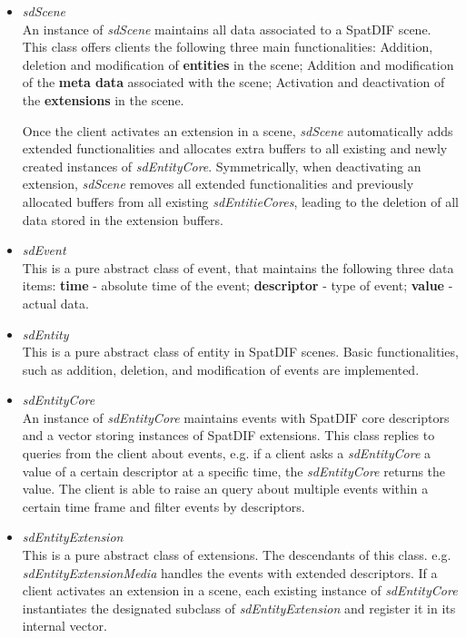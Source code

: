 \documentclass{article}
\begin{document}
\begin{itemize}[leftmargin=-0.0mm]
\item[] \emph{sdScene}\\
An instance of \emph{sdScene} maintains all data associated to a SpatDIF scene. This class offers clients the following three main functionalities: Addition, deletion and modification of \textbf{entities} in the scene; Addition and modification of the \textbf{meta data} associated with the scene; Activation and deactivation of the \textbf{extensions} in the scene.

Once the client activates an extension in a scene, \emph{sdScene} automatically adds extended functionalities and allocates extra buffers to all existing and newly created instances of \emph{sdEntityCore}. 
Symmetrically, when deactivating an extension, \emph{sdScene} removes all extended functionalities and previously allocated buffers from all existing \emph{sdEntitieCores}, leading to the deletion of all data stored in the extension buffers.

\item[] \emph{sdEvent}\\
This is a pure abstract class of event, that maintains the following three data items: \textbf{time} - absolute time of the event; \textbf{descriptor} - type of event; \textbf{value} - actual data.

\item[] \emph{sdEntity}\\
This is a pure abstract class of entity in SpatDIF scenes. Basic functionalities, such as addition, deletion, and modification of events are implemented.

\item[] \emph{sdEntityCore}\\
An instance of \emph{sdEntityCore} maintains events with SpatDIF core descriptors and a vector storing instances of SpatDIF extensions. 
This class replies to queries from the client about events, e.g. if a client asks a \emph{sdEntityCore} a value of a certain descriptor at a specific time, the \emph{sdEntityCore} returns the value. 
The client is able to raise an query about multiple events within a certain time frame and filter events by descriptors. 

\item[] \emph{sdEntityExtension}\\
This is a pure abstract class of extensions. The descendants of this class. e.g. \emph{sdEntityExtensionMedia} handles the events with extended descriptors. 
If a client activates an extension in a scene, each existing instance of \emph{sdEntityCore} instantiates the designated subclass of \emph{sdEntityExtension} and register it in its internal vector.


\end{itemize}
\end{document}
